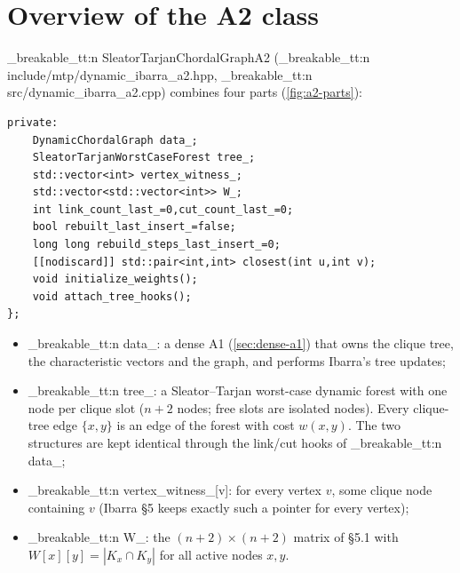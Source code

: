 \documentclass[11pt,a4paper,oneside]{report}
\theoremstyle{plain}
\theoremstyle{definition}
\theoremstyle{remark}
\DeclareRobustCommand{\code}[1]{\mtp_breakable_tt:n {#1}}
\DeclareRobustCommand{\file}[1]{\mtp_breakable_tt:n {#1}}
\begin{document}
\section{Overview of the A2 class}\label{sec:a2-structure}
\code{SleatorTarjanChordalGraphA2} (\file{include/mtp/dynamic_ibarra_a2.hpp},
\file{src/dynamic_ibarra_a2.cpp}) combines four parts (\cref{fig:a2-parts}):

\begin{lstlisting}[style=cpp,firstnumber=44,caption={\file{include/mtp/dynamic_ibarra_a2.hpp}, lines 44--55: the members of the A2 class.},label={lst:a2-members}]
private:
    DynamicChordalGraph data_;
    SleatorTarjanWorstCaseForest tree_;
    std::vector<int> vertex_witness_;
    std::vector<std::vector<int>> W_;
    int link_count_last_=0,cut_count_last_=0;
    bool rebuilt_last_insert_=false;
    long long rebuild_steps_last_insert_=0;
    [[nodiscard]] std::pair<int,int> closest(int u,int v);
    void initialize_weights();
    void attach_tree_hooks();
};
\end{lstlisting}

\begin{itemize}
\item \code{data_}: a dense A1 (\cref{sec:dense-a1}) that owns the clique tree, the
  characteristic vectors and the graph, and performs Ibarra's tree updates;
\item \code{tree_}: a Sleator--Tarjan worst-case dynamic forest with one node per clique slot
  (\(n+2\) nodes; free slots are isolated nodes). Every clique-tree edge \(\{x,y\}\) is an edge of
  the forest with cost \(w(x,y)\). The two structures are kept identical through the link/cut
  hooks of \code{data_};
\item \code{vertex_witness_[v]}: for every vertex \(v\), some clique node containing \(v\)
  (Ibarra \S5 keeps exactly such a pointer for every vertex);
\item \code{W_}: the \((n+2)\times(n+2)\) matrix of \S5.1 with
  \(W[x][y]=|K_x\cap K_y|\) for all active nodes \(x,y\).
\end{itemize}
\end{document}
